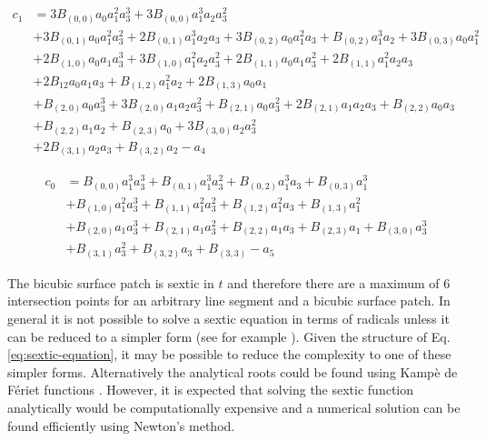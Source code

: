 \documentclass[
10pt, %
a4paper, %
oneside, %
headinclude,footinclude, %
BCOR5mm, %
]{scrartcl}
\begin{document}
\begin{equation}
\begin{split}
c_1 &= 3 B_{(0,0)} a_{0} a_{1}^{2} a_{3}^{3} + 3 B_{(0,0)} a_{1}^{3} a_{2} a_{3}^{2} \\
&+ 3 B_{(0,1)} a_{0} a_{1}^{2} a_{3}^{2} + 2 B_{(0,1)} a_{1}^{3} a_{2} a_{3}
+ 3 B_{(0,2)} a_{0} a_{1}^{2} a_{3} + B_{(0,2)} a_{1}^{3} a_{2} + 3 B_{(0,3)} a_{0} a_{1}^{2} \\
&+ 2 B_{(1,0)} a_{0} a_{1} a_{3}^{3} + 3 B_{(1,0)} a_{1}^{2} a_{2} a_{3}^{2}
+ 2 B_{(1,1)} a_{0} a_{1} a_{3}^{2} + 2 B_{(1,1)} a_{1}^{2} a_{2} a_{3} \\
&+ 2 B_{12} a_{0} a_{1} a_{3} + B_{(1,2)} a_{1}^{2} a_{2} + 2 B_{(1,3)} a_{0} a_{1} \\
&+ B_{(2,0)} a_{0} a_{3}^{3} + 3 B_{(2,0)} a_{1} a_{2} a_{3}^{2} + B_{(2,1)} a_{0} a_{3}^{2} + 2 B_{(2,1)} a_{1} a_{2} a_{3} + B_{(2,2)} a_{0} a_{3} \\
&+ B_{(2,2)} a_{1} a_{2} + B_{(2,3)} a_{0} + 3 B_{(3,0)} a_{2} a_{3}^{2} \\
&+ 2 B_{(3,1)} a_{2} a_{3} + B_{(3,2)} a_{2} - a_4
\end{split}
\end{equation}

\begin{equation}
\begin{split}
c_0 &= B_{(0,0)} a_{1}^{3} a_{3}^{3} + B_{(0,1)} a_{1}^{3} a_{3}^{2} + B_{(0,2)} a_{1}^{3} a_{3} + B_{(0,3)} a_{1}^{3} \\
&+ B_{(1,0)} a_{1}^{2} a_{3}^{3} + B_{(1,1)} a_{1}^{2} a_{3}^{2} + B_{(1,2)} a_{1}^{2} a_{3} + B_{(1,3)} a_{1}^{2} \\
&+ B_{(2,0)} a_{1} a_{3}^{3} + B_{(2,1)} a_{1} a_{3}^{2} + B_{(2,2)} a_{1} a_{3} + B_{(2,3)} a_{1} + B_{(3,0)} a_{3}^{3} \\
&+ B_{(3,1)} a_{3}^{2} + B_{(3,2)} a_{3} + B_{(3,3)} - a_5
\end{split}
\end{equation}

The bicubic surface patch is sextic in $t$ and therefore there are a maximum of 6 intersection points for an arbitrary line segment and a bicubic surface patch. In general it is not possible to solve a sextic equation in terms of radicals unless it can be reduced to a simpler form (see for example \cite{coble1911application,coble1911reduction,cole1886contribution}). Given the structure of Eq. \eqref{eq:sextic-equation}, it may be possible to reduce the complexity to one of these simpler forms. Alternatively the analytical roots could be found using Kamp\`{e} de F\'{e}riet functions \cite{exton1976multiple}. However, it is expected that solving the sextic function analytically would be computationally expensive and a numerical solution can be found efficiently using Newton's method.
\end{document}
